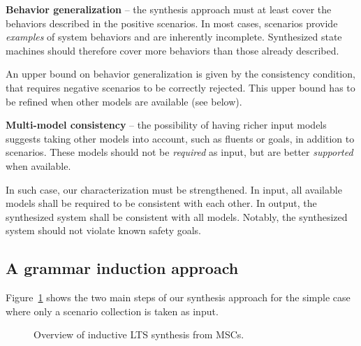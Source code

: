 \noindent \textbf{Behavior generalization} -- the synthesis approach must at least cover the behaviors described in the positive scenarios. In most cases, scenarios provide \emph{examples} of system behaviors and are inherently incomplete. Synthesized state machines should therefore cover more behaviors than those already described. 

An upper bound on behavior generalization is given by the consistency condition, that requires negative scenarios to be correctly rejected. This upper bound has to be refined when other models are available (see below).

\noindent \textbf{Multi-model consistency} -- the possibility of having richer input models suggests taking other models into account, such as fluents or goals, in addition to scenarios. These models should not be \emph{required} as input, but are better \emph{supported} when available. 

In such case, our characterization must be strengthened. In input, all available models shall be required to be consistent with each other. In output, the synthesized system shall be consistent with all models. Notably, the synthesized system should not violate known safety goals.


\subsection{A grammar induction approach\label{subsection:inductive-synthesis-approach}}

Figure~\ref{image:inductive-synthesis-overview} shows the two main steps of our synthesis approach for the simple case where only a scenario collection is taken as input. 

\begin{figure}[H]\centering
  \caption{Overview of inductive LTS synthesis from MSCs.\label{image:inductive-synthesis-overview}}
\end{figure}

